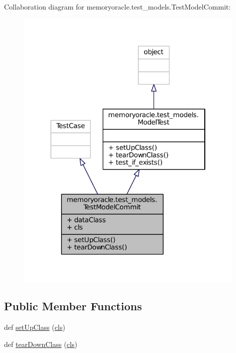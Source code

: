 Collaboration diagram for memoryoracle.\+test\+\_\+models.\+Test\+Model\+Commit\+:\nopagebreak
\begin{figure}[H]
\begin{center}
\leavevmode
\includegraphics[width=310pt]{classmemoryoracle_1_1test__models_1_1TestModelCommit__coll__graph}
\end{center}
\end{figure}
\subsection*{Public Member Functions}
\begin{DoxyCompactItemize}
\item 
def \hyperlink{classmemoryoracle_1_1test__models_1_1TestModelCommit_aa9a57fdd95d4abfe3c0fd7d30218e75b}{set\+Up\+Class} (\hyperlink{classmemoryoracle_1_1test__models_1_1TestModelCommit_a3d019c6704de86b58f26f74025af151b}{cls})
\item 
def \hyperlink{classmemoryoracle_1_1test__models_1_1TestModelCommit_ae47dbb8f4d64622b581bce0fcdda65db}{tear\+Down\+Class} (\hyperlink{classmemoryoracle_1_1test__models_1_1TestModelCommit_a3d019c6704de86b58f26f74025af151b}{cls})
\end{DoxyCompactItemize}
